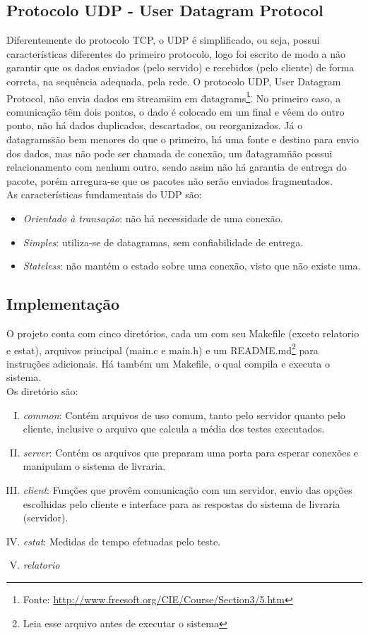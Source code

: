 \documentclass[a4paper,10pt]{article}
\begin{document}
\subsection{Protocolo UDP - User Datagram Protocol}
Diferentemente do protocolo TCP, o UDP é simplificado, ou seja, possui características diferentes do primeiro protocolo, logo foi escrito de modo a não garantir que os dados enviados (pelo
servido) e recebidos (pelo cliente) de forma correta, na sequência 
adequada, pela rede.
O protocolo UDP, User Datagram Protocol, não envia dados em \"stream\" sim em \"datagrams\footnote{Fonte: \url{http://www.freesoft.org/CIE/Course/Section3/5.htm} }\". No primeiro caso, a comunicação têm dois pontos, o dado é colocado em um final e vêem do outro ponto, não há dados duplicados, descartados, ou reorganizados. Já o \"datagrams\" são bem menores do que o primeiro, há uma fonte e destino para envio dos dados, mas não pode ser chamada de conexão, um \"datagram\" não possui relacionamento com nenhum outro, sendo assim não há garantia de entrega do pacote, porém arregura-se que os pacotes não serão enviados fragmentados. 
\\As características fundamentais do UDP são:
\begin{itemize}
\item \emph{Orientado à transação}: não há necessidade de uma conexão.
\item \emph{Simples}: utiliza-se de datagramas, sem confiabilidade de entrega.
\item \emph{Stateless}: não mantém o estado sobre uma conexão, visto que não existe uma.
\end{itemize}
\subsection{Implementação}
O projeto conta com cinco diretórios, cada um com seu Makefile (exceto relatorio e estat), arquivos
principal (main.c e main.h) e um README.md\footnote{Leia esse arquivo antes de
executar o sistema} para instruções adicionais. Há também um Makefile, o qual 
compila e executa o sistema.
\\Os diretório são:
\begin{enumerate}[I.]
\label{sec:dirs}
\item \label{itm:common} \emph{common}: Contém arquivos de uso comum, tanto pelo servidor quanto 
pelo cliente, inclusive o arquivo que calcula a média dos testes executados.
\item \label{itm:server} \emph{server}: Contém os arquivos que preparam uma porta para esperar
conexões e manipulam o sistema de livraria.
\item \label{itm:client} \emph{client}: Funções que provêm comunicação com um servidor, envio das opções
escolhidas pelo cliente e interface para as respostas do sistema de livraria
(servidor).
\item \label{itm:estat} \emph{estat}: Medidas de tempo efetuadas pelo teste.
\item \label{itm:relatorio} \emph{relatorio}
\end{enumerate}
\end{document}
